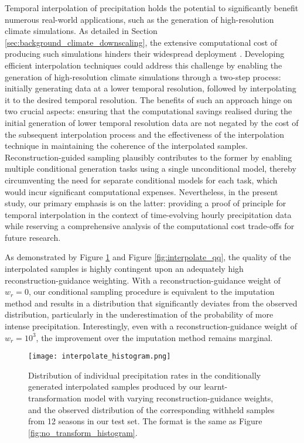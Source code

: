 \documentclass[ oneside,%
                    author={George Herbert},
                    degree={MSci},
                     title={Diffusion Models for Time-Evolving Precipitation Fields},
                  subtitle={}]{dissertation}
\begin{document}
Temporal interpolation of precipitation holds the potential to significantly benefit numerous real-world applications, such as the generation of high-resolution climate simulations. As detailed in Section \ref{sec:background_climate_downscaling}, the extensive computational cost of producing such simulations hinders their widespread deployment \cite{MO_CPM}. Developing efficient interpolation techniques could address this challenge by enabling the generation of high-resolution climate simulations through a two-step process: initially generating data at a lower temporal resolution, followed by interpolating it to the desired temporal resolution. The benefits of such an approach hinge on two crucial aspects: ensuring that the computational savings realised during the initial generation of lower temporal resolution data are not negated by the cost of the subsequent interpolation process and the effectiveness of the interpolation technique in maintaining the coherence of the interpolated samples. Reconstruction-guided sampling plausibly contributes to the former by enabling multiple conditional generation tasks using a single unconditional model, thereby circumventing the need for separate conditional models for each task, which would incur significant computational expenses. Nevertheless, in the present study, our primary emphasis is on the latter: providing a proof of principle for temporal interpolation in the context of time-evolving hourly precipitation data while reserving a comprehensive analysis of the computational cost trade-offs for future research.

As demonstrated by Figure \ref{fig:interpolate_histogram} and Figure \ref{fig:interpolate_qq}, the quality of the interpolated samples is highly contingent upon an adequately high reconstruction-guidance weighting. With a reconstruction-guidance weight of $w_r=0$, our conditional sampling procedure is equivalent to the imputation method \cite{Score_Based_Song} and results in a distribution that significantly deviates from the observed distribution, particularly in the underestimation of the probability of more intense precipitation. Interestingly, even with a reconstruction-guidance weight of $w_r=10^3$, the improvement over the imputation method remains marginal.

\begin{figure}[htbp]
      \centering
      \texttt{[image: interpolate\_histogram.png]}
      \caption{Distribution of individual precipitation rates in the conditionally generated interpolated samples produced by our learnt-transformation model with varying reconstruction-guidance weights, and the observed distribution of the corresponding withheld samples from 12 seasons in our test set. The format is the same as Figure \ref{fig:no_transform_histogram}.}
      \label{fig:interpolate_histogram}
\end{figure}
\end{document}
